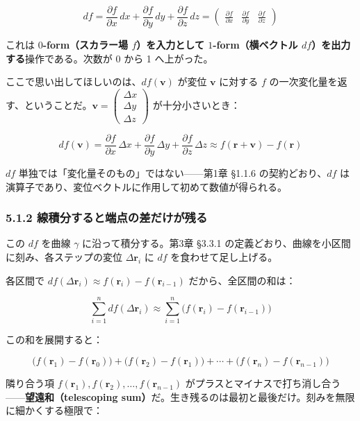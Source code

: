 \documentclass[a4paper,12pt,openany]{book}
\begin{document}
\[df = \frac{\partial f}{\partial x}\,dx + \frac{\partial f}{\partial y}\,dy + \frac{\partial f}{\partial z}\,dz = \begin{pmatrix} \frac{\partial f}{\partial x} & \frac{\partial f}{\partial y} & \frac{\partial f}{\partial z} \end{pmatrix}\]

これは
\textbf{$0$-form（スカラー場 $f$）を入力として $1$-form（横ベクトル $df$）を出力する}操作である。次数が
0 から 1 へ上がった。

ここで思い出してほしいのは、\(df(\mathbf{v})\) が変位 \(\mathbf{v}\)
に対する \(f\)
の一次変化量を返す、ということだ。\(\mathbf{v} = \begin{pmatrix}\Delta x\\\Delta y\\\Delta z\end{pmatrix}\)
が十分小さいとき：

\[df(\mathbf{v}) = \frac{\partial f}{\partial x}\,\Delta x + \frac{\partial f}{\partial y}\,\Delta y + \frac{\partial f}{\partial z}\,\Delta z \approx f(\mathbf{r}+\mathbf{v}) - f(\mathbf{r})\]

\(df\) 単独では「変化量そのもの」ではない——第1章 §1.1.6
の契約どおり、\(df\)
は演算子であり、変位ベクトルに作用して初めて数値が得られる。

\hypertarget{ux7ddaux7a4dux5206ux3059ux308bux3068ux7aefux70b9ux306eux5deeux3060ux3051ux304cux6b8bux308b}{%
\subsubsection{5.1.2
線積分すると端点の差だけが残る}\label{ux7ddaux7a4dux5206ux3059ux308bux3068ux7aefux70b9ux306eux5deeux3060ux3051ux304cux6b8bux308b}}

この \(df\) を曲線 \(\gamma\) に沿って積分する。第3章 §3.3.1
の定義どおり、曲線を小区間に刻み、各ステップの変位
\(\Delta\mathbf{r}_i\) に \(df\) を食わせて足し上げる。

各区間で
\(df(\Delta\mathbf{r}_i) \approx f(\mathbf{r}_i) - f(\mathbf{r}_{i-1})\)
だから、全区間の和は：

\[\sum_{i=1}^n df(\Delta\mathbf{r}_i) \approx \sum_{i=1}^n \bigl(f(\mathbf{r}_i) - f(\mathbf{r}_{i-1})\bigr)\]

この和を展開すると：

\[\bigl(f(\mathbf{r}_1)-f(\mathbf{r}_0)\bigr) + \bigl(f(\mathbf{r}_2)-f(\mathbf{r}_1)\bigr) + \cdots + \bigl(f(\mathbf{r}_n)-f(\mathbf{r}_{n-1})\bigr)\]

隣り合う項
\(f(\mathbf{r}_1), f(\mathbf{r}_2), \dots, f(\mathbf{r}_{n-1})\)
がプラスとマイナスで打ち消し合う——\textbf{望遠和（telescoping sum）}だ。生き残るのは最初と最後だけ。刻みを無限に細かくする極限で：
\end{document}
